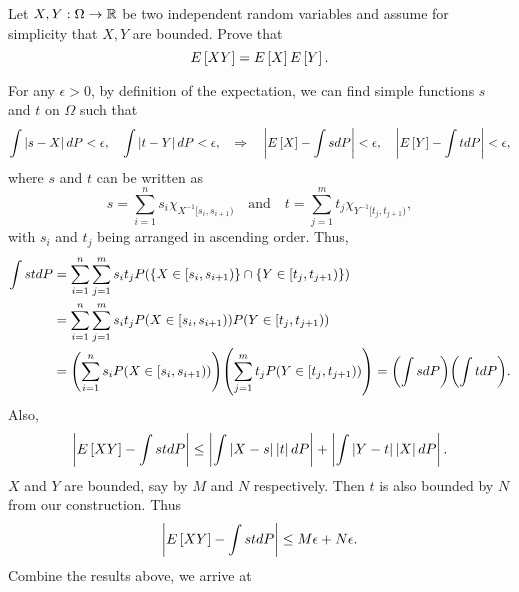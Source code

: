 \begin{exercise}{2.5}
    Let $X,Y:\Omega\to\mathbb{R}$ be two independent random variables and assume for simplicity 
    that $X,Y$ are bounded. Prove that 
    \begin{equation*}
        E\left[ {XY} \right] = E\left[ {X} \right]E\left[ {Y} \right].
    \end{equation*}
\end{exercise}
\begin{solution}
    For any $\epsilon>0$, by definition of the expectation, we can find simple functions 
    $s$ and $t$ on $\Omega$ such that 
    \begin{equation*}
        \int\left\lvert {s-X} \right\rvert dP < \epsilon, \quad
        \int\left\lvert {t-Y} \right\rvert dP < \epsilon, \quad\Rightarrow\quad
        \left\lvert {E\left[ {X} \right] - \int s dP} \right\rvert < \epsilon, \quad
        \left\lvert {E\left[ {Y} \right] - \int t dP} \right\rvert < \epsilon,
    \end{equation*}
    where $s$ and $t$ can be written as 
    \begin{equation*}
        s = \sum_{i=1}^n s_i \chi_{X^{-1}[s_i,s_{i+1})}\quad\text{and}\quad
        t = \sum_{j=1}^m t_j \chi_{Y^{-1}[t_j,t_{j+1})},
    \end{equation*}
    with $s_i$ and $t_j$ being arranged in ascending order. Thus, 
    \begin{equation*}
        \begin{split}
            \int st dP &= \sum_{i=1}^n\sum_{j=1}^m s_i t_j P(\set{X\in [s_i,s_{i+1})}\cap \set{Y\in [t_j,t_{j+1})}) \\
            &= \sum_{i=1}^n\sum_{j=1}^m s_i t_j P(X\in [s_i,s_{i+1}))P(Y\in [t_j,t_{j+1})) \\
            &= \pth{\sum_{i=1}^n s_i P(X\in [s_i,s_{i+1}))}\pth{\sum_{j=1}^m t_j P(Y\in [t_j,t_{j+1}))} 
            = \pth{\int s dP} \pth{\int t dP}.
        \end{split}
    \end{equation*}
    Also, 
    \begin{equation*}
        \left\lvert {E\left[ {XY} \right] - \int stdP} \right\rvert 
        \leq \left\lvert {\int \left\lvert {X-s} \right\rvert\left\lvert {t} \right\rvert dP} \right\rvert + \left\lvert {\int \left\lvert {Y-t} \right\rvert\left\lvert {X} \right\rvert dP} \right\rvert.
    \end{equation*}
    $X$ and $Y$ are bounded, say by $M$ and $N$ respectively. Then $t$ is also 
    bounded by $N$ from our construction. Thus 
    \begin{equation*}
        \left\lvert {E\left[ {XY} \right] - \int stdP} \right\rvert \leq M\epsilon + N\epsilon.
    \end{equation*}
    Combine the results above, we arrive at
    \begin{equation*}

\end{equation*}
\end{solution}
